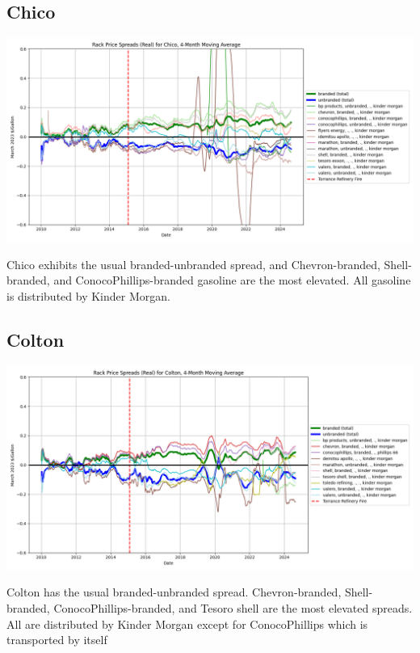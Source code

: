 \documentclass{article}
\begin{document}
\subsection{Chico}
\centering \includegraphics[width=5.5in]{chico_spread.png}\\
\raggedright Chico exhibits the usual branded-unbranded spread, and Chevron-branded, Shell-branded, and ConocoPhillips-branded gasoline are the most elevated. All gasoline is distributed by Kinder Morgan.

\subsection{Colton}
\centering \includegraphics[width=5.5in]{colton_spread.png}\\
\raggedright Colton has the usual branded-unbranded spread. Chevron-branded, Shell-branded, ConocoPhillips-branded, and Tesoro shell are the most elevated spreads. All are distributed by Kinder Morgan except for ConocoPhillips which is transported by itself
\end{document}
